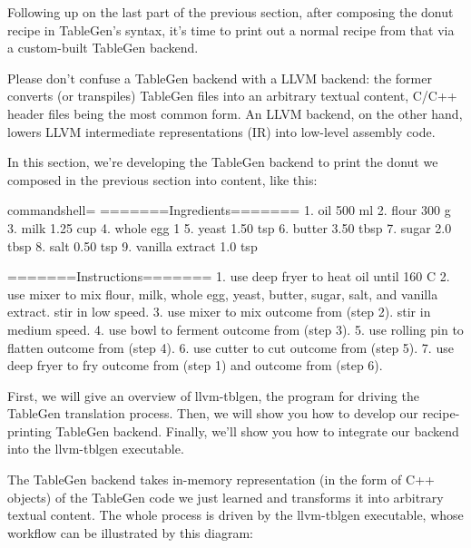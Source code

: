 Following up on the last part of the previous section, after composing the donut recipe in TableGen's syntax, it's time to print out a normal recipe from that via a custom-built TableGen backend.

\begin{tcolorbox}[colback=blue!5!white,colframe=blue!75!black, fonttitle=\bfseries,title=Note]
\hspace*{0.7cm}Please don't confuse a TableGen backend with a LLVM backend: the former converts (or transpiles) TableGen files into an arbitrary textual content, C/C++ header files being the most common form. An LLVM backend, on the other hand, lowers LLVM intermediate representations (IR) into low-level assembly code.
\end{tcolorbox}

In this section, we're developing the TableGen backend to print the donut we composed in the previous section into content, like this:

\begin{tcblisting}{commandshell={}}
=======Ingredients=======
1. oil 500 ml
2. flour 300 g
3. milk 1.25 cup
4. whole egg 1
5. yeast 1.50 tsp
6. butter 3.50 tbsp
7. sugar 2.0 tbsp
8. salt 0.50 tsp
9. vanilla extract 1.0 tsp

=======Instructions=======
1. use deep fryer to heat oil until 160 C
2. use mixer to mix flour, milk, whole egg, yeast, butter,
sugar, salt, and vanilla extract. stir in low speed.
3. use mixer to mix outcome from (step 2). stir in medium
speed.
4. use bowl to ferment outcome from (step 3).
5. use rolling pin to flatten outcome from (step 4).
6. use cutter to cut outcome from (step 5).
7. use deep fryer to fry outcome from (step 1) and outcome from
(step 6).
\end{tcblisting}

First, we will give an overview of llvm-tblgen, the program for driving the TableGen translation process. Then, we will show you how to develop our recipe-printing TableGen backend. Finally, we'll show you how to integrate our backend into the llvm-tblgen executable.



The TableGen backend takes in-memory representation (in the form of C++ objects) of the TableGen code we just learned and transforms it into arbitrary textual content. The whole process is driven by the llvm-tblgen executable, whose workflow can be illustrated by this diagram:

